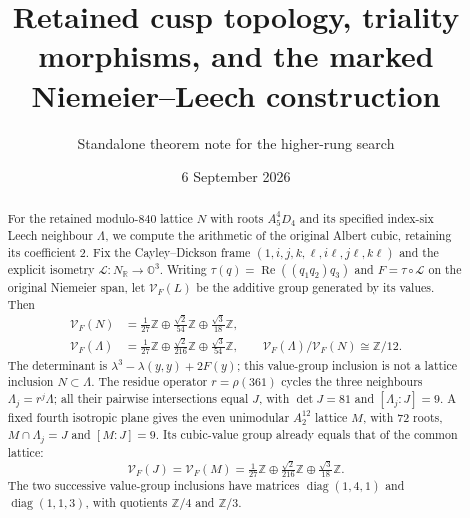 \documentclass[11pt]{article}
\title{Retained cusp topology, triality morphisms, and the
marked Niemeier--Leech construction}
\author{Standalone theorem note for the higher-rung search}
\date{6 September 2026}
\theoremstyle{definition}
\begin{document}
\maketitle

\begin{abstract}
For the retained modulo-$840$ lattice $N$ with roots $A_5^4D_4$ and
its specified index-six Leech neighbour $\Lambda$, we compute the
arithmetic of the original Albert cubic, retaining its coefficient $2$.
Fix the Cayley--Dickson frame $(1,i,j,k,\ell,i\ell,j\ell,k\ell)$ and
the explicit isometry $\mathcal L:N_{\mathbb R}\to\mathbb O^3$.
Writing $\tau(q)=\operatorname{Re}((q_1q_2)q_3)$ and
$F=\tau\circ\mathcal L$ on the original Niemeier span,
let $\mathcal V_F(L)$ be the additive group generated by its values.
Then
\[
\begin{aligned}
 \mathcal V_F(N)&=\tfrac1{27}\mathbb Z\oplus
       \tfrac{\sqrt2}{54}\mathbb Z\oplus\tfrac{\sqrt3}{18}\mathbb Z,\\
 \mathcal V_F(\Lambda)&=\tfrac1{27}\mathbb Z\oplus
       \tfrac{\sqrt2}{216}\mathbb Z\oplus\tfrac{\sqrt3}{54}\mathbb Z,
 \qquad \mathcal V_F(\Lambda)/\mathcal V_F(N)\cong\mathbb Z/12.
\end{aligned}
\]
The determinant is $\lambda^3-\lambda(y,y)+2F(y)$; this value-group
inclusion is not a lattice inclusion $N\subset\Lambda$.
The residue operator $r=\rho(361)$ cycles the three neighbours
$\Lambda_j=r^j\Lambda$; all their pairwise intersections equal $J$,
with $\det J=81$ and $[\Lambda_j:J]=9$. A fixed fourth isotropic
plane gives the even unimodular $A_2^{12}$ lattice $M$, with $72$
roots, $M\cap\Lambda_j=J$ and $[M:J]=9$.
Its cubic-value group already equals that of the common lattice:
\[
 \mathcal V_F(J)=\mathcal V_F(M)
 =\tfrac1{27}\mathbb Z\oplus\tfrac{\sqrt2}{216}\mathbb Z
                         \oplus\tfrac{\sqrt3}{18}\mathbb Z.
\]
The two successive value-group inclusions have matrices
$\operatorname{diag}(1,4,1)$ and $\operatorname{diag}(1,1,3)$,
with quotients $\mathbb Z/4$ and $\mathbb Z/3$.


\end{abstract}
\end{document}
